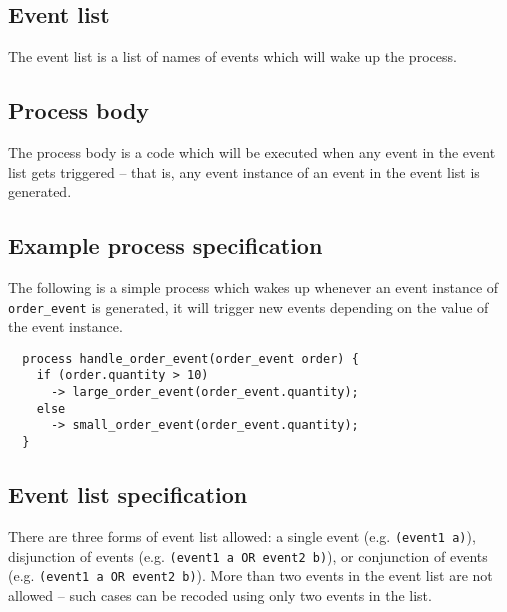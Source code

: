 \documentclass{pamsbook}
\begin{document}
\subsection{Event list}
The event list is a list of
names of events which will wake up the process. 

\subsection{Process body} The process body is a code
which will be executed when any event in the event list gets triggered -- that
is, any event instance of an event in the event list is generated.

\subsection{Example process specification}
The following is a simple process which wakes up whenever an event instance of
\verb+order_event+ is generated, it will trigger new events depending on the
value of the event instance.

\begin{verbatim}
  process handle_order_event(order_event order) {
    if (order.quantity > 10)
      -> large_order_event(order_event.quantity);
    else
      -> small_order_event(order_event.quantity);
  }
\end{verbatim}



\subsection{Event list specification}
There are three forms of event list allowed:
a single event (e.g. \verb+(event1 a)+), disjunction of events
(e.g. \verb+(event1 a OR event2 b)+), or
conjunction of events (e.g. \verb+(event1 a OR event2 b)+). 
More than two events in the event list are not allowed -- such cases can
be recoded using only two events in the list. 
\end{document}
